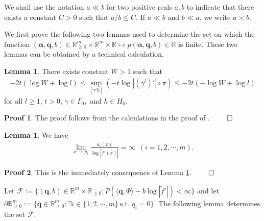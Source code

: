 \documentclass{article}
\theoremstyle{definition}
\newtheorem{lemma}[thm]{Lemma}
\newtheorem*{pf}{Proof}
\begin{document}
We shall use the notation $a\ll b$ for two positive reals $a,b$ to indicate that there exists a constant $C>0$ such that $a/b\leq C$. If $a\ll b$ and $b\ll a$, we write $a\asymp b$.

We first prove the following two lemmas used to determine the set on which the function $(\boldsymbol{\alpha},\boldsymbol{q},b)\in\mathbb{R}_{\geq 0}^m\times\mathbb{R}^m\times\mathbb{R}\mapsto p(\boldsymbol{\alpha},\boldsymbol{q},b)\in\mathbb{R}\nonumber$ is finite. 
These two lemmas can be obtained by a technical calculation.

\begin{lemma}\label{almost ^2}
    There exists constant $W>1$ such that 
\begin{align}\nonumber
    -2t(\log  W + \log l)
    \leq \sup_{ [\gamma^lh]}(-t\log |(\gamma^l)'| \circ \pi)
    \leq -2t(-\log  W + \log l)\nonumber
\end{align}
for all $l\geq 1$, $t>0$, $\gamma\in \Gamma_0,$ and $h\in H_0$.
\end{lemma}


\begin{pf}
    The proof  follows from the calculations in the proof of \cite[Lemma 2.8]{bowen1979markov}. $\qed$
\end{pf}








 




\begin{lemma}\label{asymptotic behavior of log}
We have 
\begin{align}\nonumber
\lim_{x \to p_i}\frac{a_i(x)}{\log|\tilde f'(x)|}= \infty\ \ (i=1,2,\cdots,m).
\end{align}

\end{lemma} 









\begin{pf}
This is the immediately consequence of Lemma \ref{almost ^2}. $\qed$
\end{pf}

Let $\mathcal{F}:=\{(\boldsymbol{q},b)\in\mathbb{R}^m\times\mathbb{R}_{\geq 0}:P(\langle\boldsymbol{q},\Phi\rangle-b\log|\tilde f'|)<\infty\}$ and let $\partial\mathbb{R}_{\geq 0}^m:=\lbrace\boldsymbol{q}\in\mathbb{R}^m_{\geq 0}:\exists i \in \lbrace1,2,\cdots,m\rbrace\ \text{s.t.\ }q_i=0 \rbrace$. 
The following lemma determines the set $\mathcal{F}$. 
\end{document}
